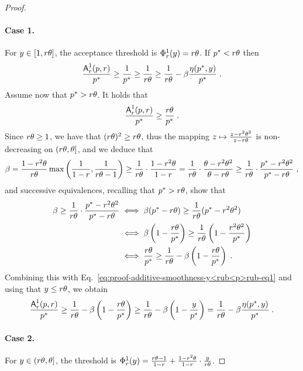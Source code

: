 \begin{proof}
\paragraph{Case 1.} For $y \in [1,r \theta]$, the acceptance threshold is $\Phi^1_r(y) = r \theta$. If $p^* < r \theta$ then
\[
\frac{\mbox{\textup{\textsf{A}}}^1_r(p,r)}{p^*} 
\geq \frac{1}{p^*}
\geq \frac{1}{r \theta}
\geq \frac{1}{r \theta} - \beta \frac{\eta(p^*,y)}{p^*}\;.
\]
Assume now that $p^* > r \theta$. It holds that
\begin{equation}\label{eq:proof-additive-smoothness-y<rub<p>rub-eq1}
\frac{\mbox{\textup{\textsf{A}}}^1_r(p,r)}{p^*} 
\geq \frac{r \theta}{p^*}\;. 
\end{equation}
Since $r \theta \geq 1$, we have that $(r \theta)^2 \geq r \theta$, thus the mapping $z \mapsto \frac{z-r^2 \theta^2}{z-r \theta}$ is non-decreasing on $(r \theta, \theta]$, and we deduce that
\[
\beta = 
\frac{1-r^2\theta}{r \theta} \max\left( \frac{1}{1-r}, \frac{1}{r \theta - 1} \right)
\geq \frac{1}{r \theta} \cdot \frac{1 - r^2\theta}{1-r}
= \frac{1}{r \theta} \cdot \frac{\theta - r^2\theta^2}{\theta-r \theta}
\geq \frac{1}{r \theta} \cdot \frac{p^* - r^2\theta^2}{p^*-r \theta}\;,
\]
and successive equivalences, recalling that $p^* > r \theta$, show that
\begin{align*}
\beta \geq \frac{1}{r \theta} \cdot \frac{p^* - r^2\theta^2}{p^*-r \theta}
&\iff \beta (p^* - r \theta) \geq \frac{1}{r \theta}(p^* - r^2\theta^2)\\
&\iff \beta \left(1 - \frac{r \theta}{p^*}\right) \geq \frac{1}{r \theta}\left(1 - \frac{r^2\theta^2}{p^*}\right)\\
&\iff \frac{r \theta}{p^*} \geq \frac{1}{r \theta} - \beta  \left(1 - \frac{r \theta}{p^*}\right)\;.
\end{align*}
Combining this with Eq.~\eqref{eq:proof-additive-smoothness-y<rub<p>rub-eq1} and using that $y \leq r \theta$, we obtain
\[
\frac{\mbox{\textup{\textsf{A}}}^1_r(p,r)}{p^*} 
\geq \frac{1}{r \theta} - \beta  \left(1 - \frac{r \theta}{p^*}\right)
\geq \frac{1}{r \theta} - \beta  \left(1 - \frac{y}{p^*}\right)
= \frac{1}{r \theta} - \beta  \frac{\eta(p^*, y)}{p^*}\;.
\]

\paragraph{Case 2.} For $y \in (r \theta, \theta]$, the threshold is $\Phi^1_r(y) = \frac{r \theta - 1}{1-r} + \frac{1-r^2\theta}{1-r} \cdot \frac{y}{r \theta}$. 


\end{proof}
